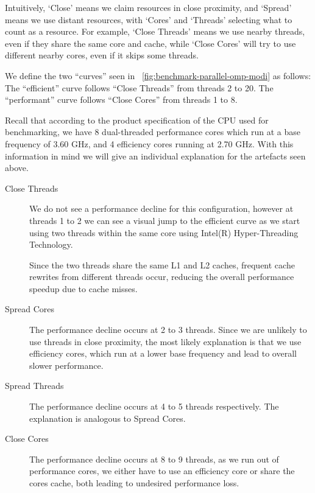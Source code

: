 \documentclass[11pt,
               a4paper,
               bibtotoc,
               idxtotoc,
               headsepline,
               footsepline,
               footexclude,
               BCOR12mm,
               DIV13,
               openany,   %
               ]
               {scrbook}
\begin{document}
Intuitively, `Close' means we claim resources in close proximity, and `Spread' means we use distant resources, with `Cores' and `Threads' selecting what to count as a resource. For example, `Close Threads' means we use nearby threads, even if they share the same core and cache, while `Close Cores' will try to use different nearby cores, even if it skips some threads.

We define the two ``curves'' seen in ~\autoref{fig:benchmark-parallel-omp-modi} as follows: The ``efficient'' curve follows ``Close Threads'' from threads 2 to 20. The ``performant'' curve follows ``Close Cores'' from threads 1 to 8.

Recall that according to the product specification of the CPU used for benchmarking\cite{cpu-intel-core-i7-12700k}, we have 8 dual-threaded performance cores which run at a base frequency of 3.60 GHz, and 4 efficiency cores running at 2.70 GHz. With this information in mind we will give an individual explanation for the artefacts seen above.

\begin{description}
    \item[Close Threads] We do not see a performance decline for this configuration, however at threads 1 to 2 we can see a visual jump to the efficient curve as we start using two threads within the same core using Intel(R) Hyper-Threading Technology.

    Since the two threads share the same L1 and L2 caches, frequent cache rewrites from different threads occur, reducing the overall performance speedup due to cache misses.

    \item[Spread Cores] The performance decline occurs at 2 to 3 threads. Since we are unlikely to use threads in close proximity, the most likely explanation is that we use efficiency cores, which run at a lower base frequency and lead to overall slower performance.

    \item[Spread Threads] The performance decline occurs at 4 to 5 threads respectively. The explanation is analogous to Spread Cores.

    \item[Close Cores] The performance decline occurs at 8 to 9 threads, as we run out of performance cores, we either have to use an efficiency core or share the cores cache, both leading to undesired performance loss.
\end{description}
\end{document}
